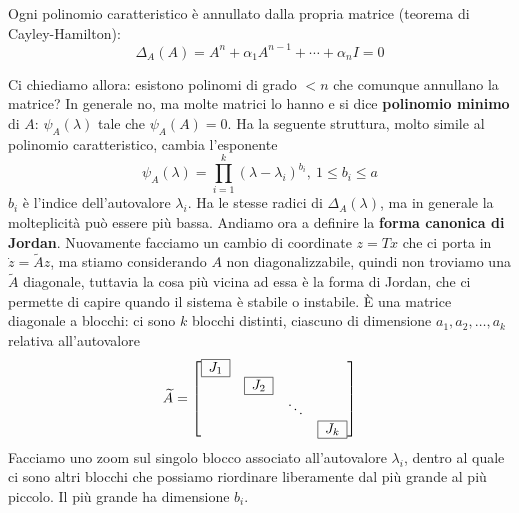 \begin{rem}
	Ogni polinomio caratteristico è annullato dalla propria matrice (teorema di Cayley-Hamilton):\begin{equation*}
	\Delta _A\left(A\right) =A^n +\alpha _1 A^{n-1} +\cdots +\alpha _n I=0
	\end{equation*}
\end{rem}
Ci chiediamo allora: esistono polinomi di grado $< n$ che comunque annullano la matrice? In generale no, ma molte matrici lo hanno e si dice \textbf{polinomio minimo} di $A$: $\psi _A\left(\lambda \right)$ tale che $\psi _A\left(A\right) =0$. Ha la seguente struttura, molto simile al polinomio caratteristico, cambia l'esponente
\begin{equation}
	\psi _A\left(\lambda \right) =\prod ^k_{i=1}\left(\lambda -\lambda _i\right)^{b_i} ,\ 1\leq b_i \leq a
\end{equation}
$b_i$ è l'indice dell'autovalore $\lambda _i$. Ha le stesse radici di $\Delta _A\left(\lambda \right)$, ma in generale la molteplicità può essere più bassa. Andiamo ora a definire la \textbf{forma canonica di Jordan}. Nuovamente facciamo un cambio di coordinate $z=Tx$ che ci porta in $\dot{z} =\tilde{A} z$, ma stiamo considerando $A$ non diagonalizzabile, quindi non troviamo una $\tilde{A}$ diagonale, tuttavia la cosa più vicina ad essa è la forma di Jordan, che ci permette di capire quando il sistema è stabile o instabile. È una matrice diagonale a blocchi: ci sono $k$ blocchi distinti, ciascuno di dimensione $a_1 ,a_2 ,\dotsc ,a_k$ relativa all'autovalore
\begin{equation*}
	\tilde{A} =\begin{bmatrix}
	\begin{array}{|c|}
		\hline 
		J_1    \\
		\hline 
	\end{array} &  &  & \\
	& \begin{array}{|c|}
	\hline
	J_2\\
	\hline
	\end{array} &  & \\
	&  & \ddots  & \\
	&  &  & \begin{array}{|c|}
	\hline
	J_k\\
	\hline
	\end{array}
	\end{bmatrix}
\end{equation*}
Facciamo uno zoom sul singolo blocco associato all'autovalore $\lambda _i$, dentro al quale ci sono altri blocchi che possiamo riordinare liberamente dal più grande al più piccolo. Il più grande ha dimensione $b_i$.
